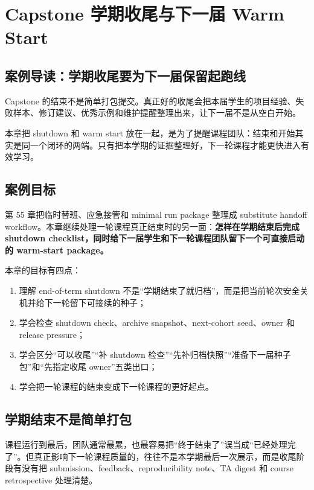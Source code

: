 \chapter{Capstone 学期收尾与下一届 Warm Start}

\section{案例导读：学期收尾要为下一届保留起跑线}

Capstone 的结束不是简单打包提交。真正好的收尾会把本届学生的项目经验、失败样本、修订建议、优秀示例和维护提醒整理出来，让下一届不是从空白开始。

本章把 shutdown 和 warm start 放在一起，是为了提醒课程团队：结束和开始其实是同一个闭环的两端。只有把本学期的证据整理好，下一轮课程才能更快进入有效学习。

\section{案例目标}

第 55 章把临时替班、应急接管和 minimal run package 整理成 substitute handoff workflow。本章继续处理一轮课程真正结束时的另一面：\textbf{怎样在学期结束后完成 shutdown checklist，同时给下一届学生和下一轮课程团队留下一个可直接启动的 warm-start package。}

本章的目标有四点：

\begin{enumerate}
    \item 理解 end-of-term shutdown 不是“学期结束了就归档”，而是把当前轮次安全关机并给下一轮留下可接续的种子；
    \item 学会检查 shutdown check、archive snapshot、next-cohort seed、owner 和 release pressure；
    \item 学会区分“可以收尾”“补 shutdown 检查”“先补归档快照”“准备下一届种子包”和“先指定收尾 owner”五类出口；
    \item 学会把一轮课程的结束变成下一轮课程的更好起点。
\end{enumerate}

\section{学期结束不是简单打包}

课程运行到最后，团队通常最累，也最容易把“终于结束了”误当成“已经处理完了”。但真正影响下一轮课程质量的，往往不是本学期最后一次展示，而是收尾阶段有没有把 submission、feedback、reproducibility note、TA digest 和 course retrospective 处理清楚。

